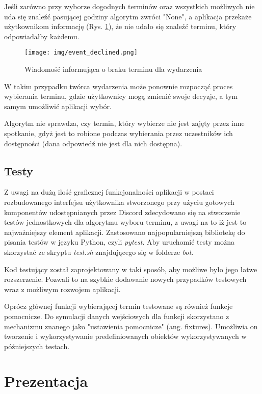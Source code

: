 \documentclass[11pt,a4paper]{article}
\begin{document}
Jeśli zarówno przy wyborze dogodnych terminów oraz wszystkich możliwych nie uda się znaleźć pasującej godziny algorytm zwróci "None", a aplikacja przekaże użytkownikom informację (Rys. \ref{img: event declined}), że nie udało się znaleźć terminu, który odpowiadałby każdemu. 

\begin{figure}[H]
    \centering
    \texttt{[image: img/event\_declined.png]}
    \caption{Wiadomość informująca o braku terminu dla wydarzenia}
    \label{img: event declined}
\end{figure}

W takim przypadku twórca wydarzenia może ponownie rozpocząć proces wybierania terminu, gdzie użytkownicy mogą zmienić swoje decyzje, a tym samym umożliwić aplikacji wybór.

Algorytm nie sprawdza, czy termin, który wybierze nie jest zajęty przez inne spotkanie, gdyż jest to robione podczas wybierania przez uczestników ich dostępności (dana odpowiedź nie jest dla nich dostępna).

\subsection{Testy}

Z uwagi na dużą ilość graficznej funkcjonalności aplikacji w postaci rozbudowanego interfejsu użytkownika stworzonego przy użyciu gotowych komponentów udostępnianych przez Discord zdecydowano się na stworzenie testów jednostkowych dla algorytmu wyboru terminu, z uwagi na to iż jest to najważniejszy element aplikacji. Zastosowano najpopularniejszą bibliotekę do pisania testów w języku Python, czyli \textit{pytest}. Aby uruchomić testy można skorzystać ze skryptu \textit{test.sh} znajdującego się w folderze \textit{bot}. 

Kod testujący został zaprojektowany w taki sposób, aby możliwe było jego łatwe rozszerzenie. Pozwali to na szybkie dodawanie nowych przypadków testowych wraz z możliwym rozwojem aplikacji.

Oprócz głównej funkcji wybierającej termin testowane są również funkcje pomocnicze. Do symulacji danych wejściowych dla funkcji skorzystano z mechanizmu znanego jako "ustawienia pomocnicze" (ang. fixtures). Umożliwia on tworzenie i wykorzystywanie predefiniowanych obiektów wykorzystywanych w późniejszych testach.

\section{Prezentacja}
\end{document}
